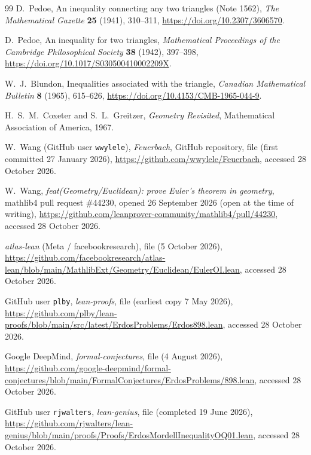 \documentclass[11pt]{article}
\theoremstyle{definition}
\theoremstyle{remark}
\begin{document}
\begin{thebibliography}{99}
D.~Pedoe, An inequality connecting any two triangles (Note 1562), \emph{The Mathematical Gazette}
\textbf{25} (1941), 310--311, \url{https://doi.org/10.2307/3606570}.

D.~Pedoe, An inequality for two triangles, \emph{Mathematical Proceedings of the Cambridge
Philosophical Society} \textbf{38} (1942), 397--398, \url{https://doi.org/10.1017/S030500410002209X}.

W.~J.~Blundon, Inequalities associated with the triangle, \emph{Canadian Mathematical Bulletin}
\textbf{8} (1965), 615--626, \url{https://doi.org/10.4153/CMB-1965-044-9}.

H.~S.~M.~Coxeter and S.~L.~Greitzer,
\emph{Geometry Revisited},
Mathematical Association of America, 1967.

W.~Wang (GitHub user \texttt{wwylele}), \emph{Feuerbach}, GitHub repository, file
 (first committed 27 January 2026),
\url{https://github.com/wwylele/Feuerbach}, accessed 28 October 2026.

W.~Wang, \emph{feat(Geometry/Euclidean): prove Euler's theorem in geometry}, mathlib4 pull request \#44230, opened 26 September 2026 (open at the time of writing),
\url{https://github.com/leanprover-community/mathlib4/pull/44230}, accessed 28 October 2026.

\emph{atlas-lean} (Meta / facebookresearch), file 
(5 October 2026),
\url{https://github.com/facebookresearch/atlas-lean/blob/main/MathlibExt/Geometry/Euclidean/EulerOI.lean},
accessed 28 October 2026.

GitHub user \texttt{plby}, \emph{lean-proofs}, file 
(earliest copy 7 May 2026),
\url{https://github.com/plby/lean-proofs/blob/main/src/latest/ErdosProblems/Erdos898.lean},
accessed 28 October 2026.

Google DeepMind, \emph{formal-conjectures}, file 
(4 August 2026),
\url{https://github.com/google-deepmind/formal-conjectures/blob/main/FormalConjectures/ErdosProblems/898.lean},
accessed 28 October 2026.

GitHub user \texttt{rjwalters}, \emph{lean-genius}, file
 (completed 19 June 2026),
\url{https://github.com/rjwalters/lean-genius/blob/main/proofs/Proofs/ErdosMordellInequalityOQ01.lean},
accessed 28 October 2026.


\end{thebibliography}
\end{document}
